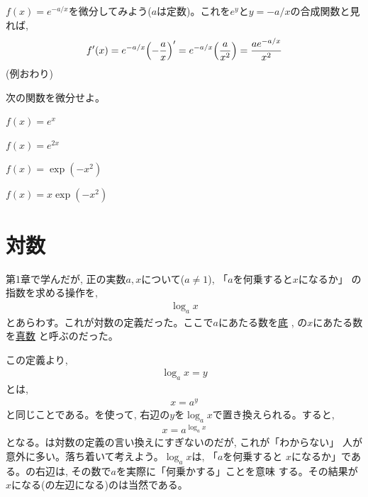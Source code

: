 \begin{exmpl} $f(x)=e^{-a/x}$を微分してみよう($a$は定数)。これを$e^y$と$y=-a/x$の合成関数と見れば, 
\begin{eqnarray}f'(x)=e^{-a/x}\Bigl(-\frac{a}{x}\Bigr)'
=e^{-a/x}\Bigl(\frac{a}{x^2}\Bigr)=\frac{ae^{-a/x}}{x^2}\nonumber\\\end{eqnarray}
(例おわり)\end{exmpl}
\mv

\begin{q}\label{q:exp_diff0} 次の関数を微分せよ。
\begin{edaenumerate}
\item $f(x)=e^x$
\item $f(x)=e^{2x}$
\item $f(x)=\exp(-x^2)$
\item $f(x)=x \exp(-x^2)$
\end{edaenumerate}\end{q}
\mv


\section{対数}

第1章で学んだが, 正の実数$a, x$について($a\neq1$), 「$a$を何乗すると$x$になるか」
の指数を求める操作を, 
\begin{eqnarray}
\log_a x\label{eq:taisuu00_again}
\end{eqnarray}
とあらわす。これが対数の定義だった。ここで$a$にあたる数を\underline{底} , の$x$にあたる数を\underline{真数} と呼ぶのだった。

この定義より, 
\begin{eqnarray}
\log_a x=y\label{eq:log1}
\end{eqnarray}
とは, 
\begin{eqnarray}
x=a^y\label{eq:log2}
\end{eqnarray}
と同じことである。を使って, 右辺の$y$を$\log_a x$で置き換えられる。すると, 
\begin{eqnarray}
x=a^{\log_a x}\label{eq:log3}
\end{eqnarray}
となる。は対数の定義の言い換えにすぎないのだが, これが「わからない」
人が意外に多い。落ち着いて考えよう。$\log_a x$は, 「$a$を何乗すると
$x$になるか」である。の右辺は, その数で$a$を実際に「何乗かする」ことを意味
する。その結果が$x$になる(の左辺になる)のは当然である。\mv

